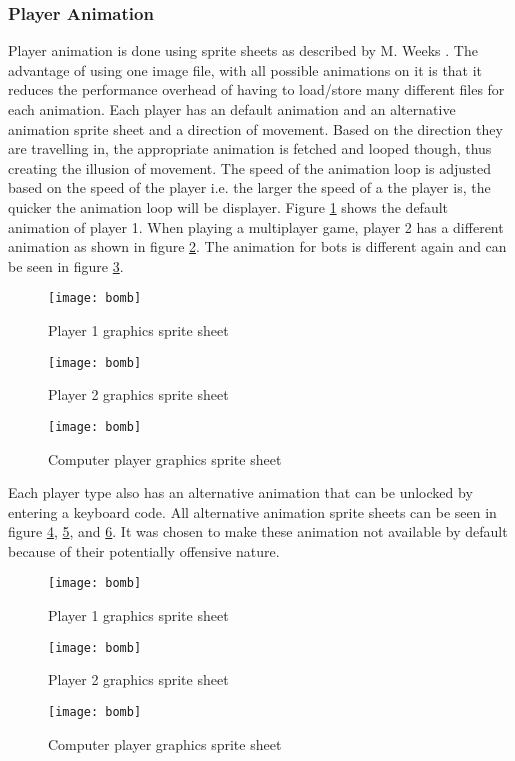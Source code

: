 \documentclass[]{article}
\begin{document}
\subsubsection{Player Animation}
Player animation is done using sprite sheets as described by M. Weeks \cite{spritesheets}. The advantage of using one image file, with all possible animations on it is that it reduces the performance overhead of having to load/store many different files for each animation. Each player has an default animation and an alternative animation sprite sheet and a direction of movement. Based on the direction they are travelling in, the appropriate animation is fetched and looped though, thus creating the illusion of movement. The speed of the animation loop is adjusted based on the speed of the player i.e. the larger the speed of a the player is, the quicker the animation loop will be displayer. Figure \ref{fig:player1Default} shows the default animation of player 1. When playing a multiplayer game, player 2 has a different animation as shown in figure \ref{fig:player2Default}. The animation for bots is different again and can be seen in figure \ref{fig:player3Default}. 
\begin{figure}[h]
    \centering
    \texttt{[image: bomb]}
    \caption{Player 1 graphics sprite sheet}
    \label{fig:player1Default}
\end{figure}
\begin{figure}[h]
    \centering
    \texttt{[image: bomb]}
    \caption{Player 2 graphics sprite sheet}
    \label{fig:player2Default}
\end{figure}
\begin{figure}[h]
    \centering
    \texttt{[image: bomb]}
    \caption{Computer player graphics sprite sheet}
    \label{fig:player3Default}
\end{figure}

Each player type also has an alternative animation that can be unlocked by entering a keyboard code. All alternative animation sprite sheets can be seen in figure \ref{fig:player1Alt}, \ref{fig:player2Alt}, and \ref{fig:player3alt}. It was chosen to make these animation not available by default because of their potentially offensive nature.


\begin{figure}[h]
    \centering
    \texttt{[image: bomb]}
    \caption{Player 1 graphics sprite sheet}
    \label{fig:player1Alt}
\end{figure}
\begin{figure}[h]
    \centering
    \texttt{[image: bomb]}
    \caption{Player 2 graphics sprite sheet}
    \label{fig:player2Alt}
\end{figure}
\begin{figure}[h]
    \centering
    \texttt{[image: bomb]}
    \caption{Computer player graphics sprite sheet}
    \label{fig:player3alt}
\end{figure}
\end{document}
